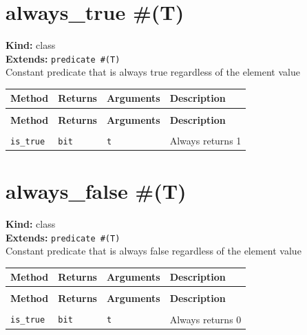 \documentclass[11pt,letterpaper]{report}
\begin{document}
\section{always\_true \#(T)}
\label{cls:alwaystrueT}

\noindent\textbf{Kind:} class\\
\noindent\textbf{Extends:} \texttt{predicate \#(T)}\\
\noindent Constant predicate that is always true regardless of the element value

\begin{xltabular}{\linewidth}{>{\small}p{1.35in} >{\small}p{1.25in} >{\small}p{0.95in} >{\small}X}
\toprule
\textbf{Method} & \textbf{Returns} & \textbf{Arguments} & \textbf{Description} \\
\midrule
\endfirsthead
{} \\
\midrule
\textbf{Method} & \textbf{Returns} & \textbf{Arguments} & \textbf{Description} \\
\midrule
\endhead
\midrule
{} \\
\endfoot
\bottomrule
\endlastfoot
\texttt{is\_true} & \texttt{bit} & \texttt{t} & Always returns 1 \\
\end{xltabular}

\section{always\_false \#(T)}
\label{cls:alwaysfalseT}

\noindent\textbf{Kind:} class\\
\noindent\textbf{Extends:} \texttt{predicate \#(T)}\\
\noindent Constant predicate that is always false regardless of the element value

\begin{xltabular}{\linewidth}{>{\small}p{1.35in} >{\small}p{1.25in} >{\small}p{0.95in} >{\small}X}
\toprule
\textbf{Method} & \textbf{Returns} & \textbf{Arguments} & \textbf{Description} \\
\midrule
\endfirsthead
{} \\
\midrule
\textbf{Method} & \textbf{Returns} & \textbf{Arguments} & \textbf{Description} \\
\midrule
\endhead
\midrule
{} \\
\endfoot
\bottomrule
\endlastfoot
\texttt{is\_true} & \texttt{bit} & \texttt{t} & Always returns 0 \\
\end{xltabular}
\end{document}
